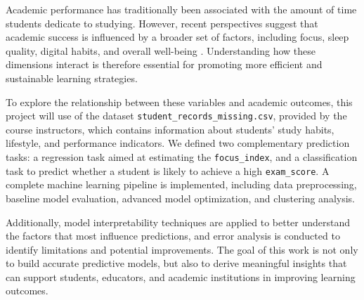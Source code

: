 
Academic performance has traditionally been associated with the amount of time students dedicate to studying. However, recent perspectives suggest that academic success is influenced by a broader set of factors, including focus, sleep quality, digital habits, and overall well-being \cite{walckiers2017students}. Understanding how these dimensions interact is therefore essential for promoting more efficient and sustainable learning strategies.

To explore the relationship between these variables and academic outcomes, this project will use of the dataset \texttt{student\_records\_missing.csv}, provided by the course instructors, which contains information about students' study habits, lifestyle, and performance indicators. We defined two complementary prediction tasks: a regression task aimed at estimating the \texttt{focus\_index}, and a classification task to predict whether a student is likely to achieve a high \texttt{exam\_score}. A complete machine learning pipeline is implemented, including data preprocessing, baseline model evaluation, advanced model optimization, and clustering analysis.

Additionally, model interpretability techniques are applied to better understand the factors that most influence predictions, and error analysis is conducted to identify limitations and potential improvements. The goal of this work is not only to build accurate predictive models, but also to derive meaningful insights that can support students, educators, and academic institutions in improving learning outcomes.